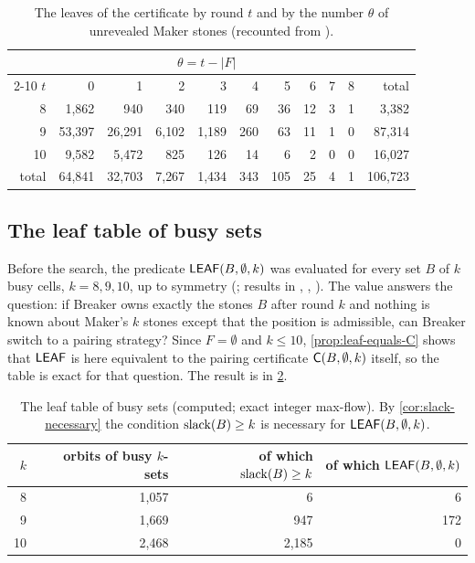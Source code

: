 \begin{table}[tbp]
\centering\small
\begin{tabular}{@{}rrrrrrrrrrr@{}}
\toprule
 & \multicolumn{9}{c}{$\theta=t-|F|$} & \\
\cmidrule(lr){2-10}
$t$ & 0 & 1 & 2 & 3 & 4 & 5 & 6 & 7 & 8 & total\\
\midrule
 8 & 1{,}862 & 940 & 340 & 119 & 69 & 36 & 12 & 3 & 1 & 3{,}382\\
 9 & 53{,}397 & 26{,}291 & 6{,}102 & 1{,}189 & 260 & 63 & 11 & 1 & 0 & 87{,}314\\
10 & 9{,}582 & 5{,}472 & 825 & 126 & 14 & 6 & 2 & 0 & 0 & 16{,}027\\
\midrule
total & 64{,}841 & 32{,}703 & 7{,}267 & 1{,}434 & 343 & 105 & 25 & 4 & 1 & 106{,}723\\
\bottomrule
\end{tabular}
\caption{The leaves of the certificate by round $t$ and by the number $\theta$ of unrevealed Maker stones
(recounted from ).}
\label{tab:leaf-theta}
\end{table}

\subsection{The leaf table of busy sets}\label{ssec:leaftable}

Before the search, the predicate $\mathsf{LEAF}(B,\emptyset,k)$ was evaluated for every set $B$ of $k$ busy
cells, $k=8,9,10$, up to symmetry (; results in
, , ). The value answers the
question: if Breaker owns exactly the stones $B$ after round $k$ and nothing is known about Maker's $k$
stones except that the position is admissible, can Breaker switch to a pairing strategy? Since $F=\emptyset$
and $k\le 10$, \cref{prop:leaf-equals-C} shows that $\mathsf{LEAF}$ is here equivalent to the pairing certificate
$\mathsf{C}(B,\emptyset,k)$ itself, so the table is exact for that question. The result is in \cref{tab:leaftable}.

\begin{table}[tbp]
\centering\small
\begin{tabular}{@{}rrrr@{}}
\toprule
$k$ & orbits of busy $k$-sets & of which $\operatorname{slack}(B)\ge k$ & of which $\mathsf{LEAF}(B,\emptyset,k)$\\
\midrule
 8 & 1{,}057 & 6 & 6\\
 9 & 1{,}669 & 947 & 172\\
10 & 2{,}468 & 2{,}185 & 0\\
\bottomrule
\end{tabular}
\caption{The leaf table of busy sets (computed; exact integer max-flow). By \cref{cor:slack-necessary}
the condition $\operatorname{slack}(B)\ge k$ is necessary for $\mathsf{LEAF}(B,\emptyset,k)$.}
\label{tab:leaftable}
\end{table}

